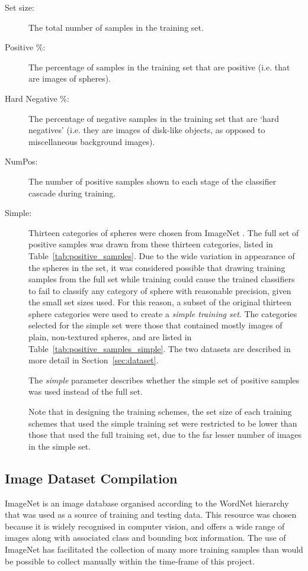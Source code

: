 \documentclass{llncs}
\newcommand{\scarequotes}[1]{`#1'}
\newcommand{\newterm}[1]{{\textit{#1}}}
\begin{document}
{		\begin{description}
			\item[Set size:] The total number of samples in the training set.
			\item[Positive \%:] The percentage of samples in the training set that are positive (i.e. that are images of spheres).
			\item[Hard Negative \%:] The percentage of negative samples in the training set that are \scarequotes{hard negatives} (i.e. they are images of disk-like objects, as opposed to miscellaneous background images).
			\item[NumPos:] The number of positive samples shown to each stage of the classifier cascade during training.
			\item[Simple:] 
				Thirteen categories of spheres were chosen from ImageNet \citep{imagenet_cvpr09}.
				The full set of positive samples was drawn from these thirteen categories, listed in Table~\ref{tab:positive_samples}.
				Due to the wide variation in appearance of the spheres in the set, it was considered possible that drawing training samples from the full set while training could cause the trained classifiers to fail to classify any category of sphere with reasonable precision, given the small set sizes used.
				For this reason, a subset of the original thirteen sphere categories were used to create a \newterm{simple training set}.
				The categories selected for the simple set were those that contained mostly images of plain, non-textured spheres, and are listed in Table~\ref{tab:positive_samples_simple}. The two datasets are described in more detail in Section~\ref{sec:dataset}.

				The \newterm{simple} parameter describes whether the simple set of positive samples was used instead of the full set.

				Note that in designing the training schemes, the set size of each training schemes that used the simple training set were restricted to be lower than those that used the full training set, due to the far lesser number of images in the simple set.
		\end{description}

		\subsection{Image Dataset Compilation} {
		\label{sec:dataset}

			ImageNet \citep{imagenet_cvpr09} is an image database organised according to the WordNet hierarchy \citep{fellbaum1998wordnet} that was used as a source of training and testing data. This resource was chosen because it is widely recognised in computer vision, and offers a wide range of images along with associated class and bounding box information. The use of ImageNet has facilitated the collection of many more training samples than would be possible to collect manually within the time-frame of this project.

}}
\end{document}
